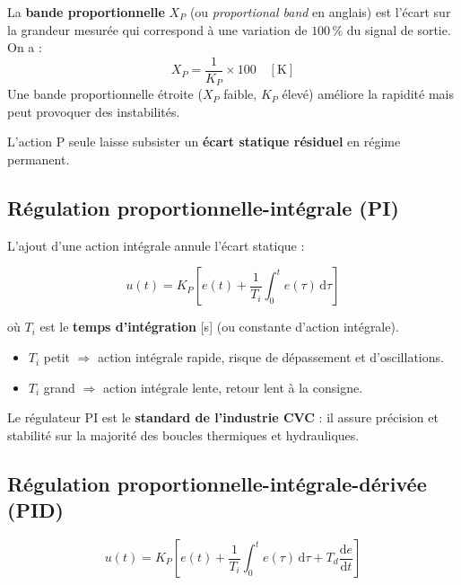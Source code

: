 \begin{definition}
  La \textbf{bande proportionnelle} $X_P$ (ou \textit{proportional band} en anglais) est l'écart sur la grandeur mesurée qui correspond à une variation de $100\,\%$ du signal de sortie. On a :
  \begin{equation}
    X_P = \frac{1}{K_P} \times 100 \quad [\si{\kelvin}]
  \end{equation}
  Une bande proportionnelle étroite ($X_P$ faible, $K_P$ élevé) améliore la rapidité mais peut provoquer des instabilités.
\end{definition}

L'action P seule laisse subsister un \textbf{écart statique résiduel} en régime permanent.

\subsection{Régulation proportionnelle-intégrale (PI)}

L'ajout d'une action intégrale annule l'écart statique :

\begin{equation}
  u(t) = K_P \left[ e(t) + \frac{1}{T_i} \int_0^t e(\tau)\,\mathrm{d}\tau \right]
\end{equation}

où $T_i$ est le \textbf{temps d'intégration} [\si{\second}] (ou constante d'action intégrale).

\begin{itemize}
  \item $T_i$ petit $\Rightarrow$ action intégrale rapide, risque de dépassement et d'oscillations.
  \item $T_i$ grand $\Rightarrow$ action intégrale lente, retour lent à la consigne.
\end{itemize}

Le régulateur PI est le \textbf{standard de l'industrie CVC} : il assure précision et stabilité sur la majorité des boucles thermiques et hydrauliques.

\subsection{Régulation proportionnelle-intégrale-dérivée (PID)}

\begin{equation}
  u(t) = K_P \left[ e(t) + \frac{1}{T_i} \int_0^t e(\tau)\,\mathrm{d}\tau + T_d \frac{\mathrm{d}e}{\mathrm{d}t} \right]
\end{equation}

